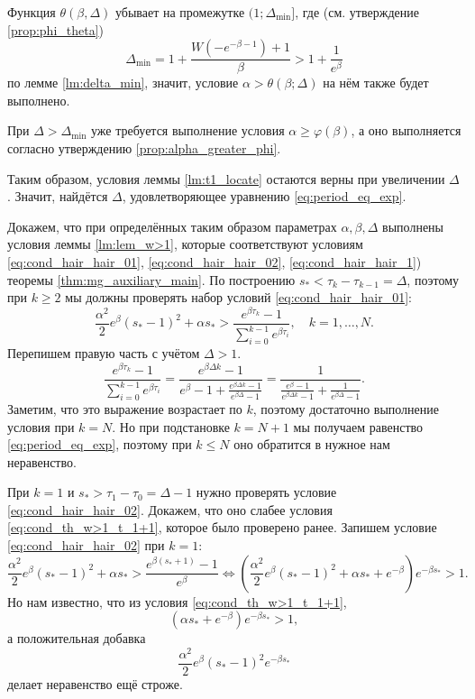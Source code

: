 Функция $\theta(\beta, \Delta)$ убывает на промежутке $(1; \Delta_{\text{min}}]$, где (см. утверждение \ref{prop:phi_theta})
%
\[\Delta_{\text{min}} = 1 + \dfrac{W(-e^{-\beta - 1}) + 1}{\beta} > 1 + \dfrac{1}{e^{\beta}}\]
%
по лемме \ref{lm:delta_min}, значит, условие $\alpha > \theta(\beta; \Delta)$ на нём также будет выполнено. %

При $\Delta > \Delta_{\text{min}}$ уже требуется выполнение условия $\alpha \geqslant \varphi(\beta)$, а оно выполняется согласно утверждению \ref{prop:alpha_greater_phi}.

Таким образом, условия леммы 
\ref{lm:t1_locate} остаются верны при увеличении $\Delta$. Значит, найдётся $\Delta$, удовлетворяющее уравнению \eqref{eq:period_eq_exp}.

Докажем, что при определённых таким образом параметрах $\alpha, \beta, \Delta$ выполнены условия леммы \ref{lm:lem_w>1}, которые соответствуют условиям \eqref{eq:cond_hair_hair_01}, \eqref{eq:cond_hair_hair_02}, \eqref{eq:cond_hair_hair_1}) теоремы \ref{thm:mg_auxiliary_main}. По построению $s_* < \tau_k - \tau_{k - 1} = \Delta$, поэтому при $k \geqslant 2$ мы должны проверять набор условий \eqref{eq:cond_hair_hair_01}:
\[
\frac{\alpha^2}{2}e^\beta(s_*-1)^2+\alpha s_* > \frac{e^{\beta \tau_k}-1}{\sum_{i=0}^{k-1}e^{\beta \tau_i}},\quad k=1,\ldots,N.
\]
%
Перепишем правую часть с учётом $\Delta > 1$.
\[
\frac{e^{\beta \tau_k}-1}{\sum_{i=0}^{k-1}e^{\beta \tau_i}} = \frac{e^{\beta\Delta k } - 1}{e^{\beta} - 1 + \frac{e^{\beta\Delta k} - 1}{e^{\beta\Delta} - 1}} = \frac{1}{\frac{e^{\beta} - 1}{e^{\beta\Delta k} - 1} + \frac{1}{e^{\beta\Delta} - 1}}.
\]
%
Заметим, что это выражение возрастает по $k$, поэтому достаточно выполнение условия при $k = N$. Но при подстановке $k = N + 1$ мы получаем равенство \eqref{eq:period_eq_exp}, поэтому при $k \leqslant N$ оно обратится в нужное нам неравенство.

При $k = 1$ и $s_* > \tau_1 - \tau_0 = \Delta - 1$ нужно проверять условие \eqref{eq:cond_hair_hair_02}. Докажем, что оно слабее условия \eqref{eq:cond_th_w>1_t_1+1}, которое было проверено ранее. Запишем условие \eqref{eq:cond_hair_hair_02} при $k=1$:
\[
\frac{\alpha^2}{2} e^{\beta}(s_* - 1)^2 + \alpha s_* > \frac{e^{\beta (s_* + 1)} - 1}{e^{\beta}} \Leftrightarrow \left(\frac{\alpha^2}{2} e^{\beta}(s_* - 1)^2 + \alpha s_* + e^{-\beta}\right)e^{-\beta s_*} > 1.
\]
%
Но нам известно, что из условия \eqref{eq:cond_th_w>1_t_1+1},
\[
\left(\alpha s_* + e^{-\beta}\right)e^{-\beta s_*} > 1,
\]
%
а положительная добавка
\[\dfrac{\alpha^2}{2} e^{\beta}(s_* - 1)^2 e^{-\beta s_*}\]
делает неравенство ещё строже.

